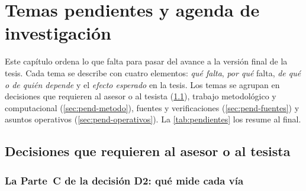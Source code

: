 \chapter{Temas pendientes y agenda de investigación}
\label{cap:pendientes}

Este capítulo ordena lo que falta para pasar del avance a la versión final de la tesis. Cada tema
se describe con cuatro elementos: \emph{qué falta}, \emph{por qué} falta, \emph{de qué o de quién
depende} y el \emph{efecto esperado} en la tesis. Los temas se agrupan en decisiones que requieren
al asesor o al tesista (\cref{sec:pend-decisiones}), trabajo metodológico y computacional
(\cref{sec:pend-metodo}), fuentes y verificaciones (\cref{sec:pend-fuentes}) y asuntos operativos
(\cref{sec:pend-operativos}). La \cref{tab:pendientes} los resume al final.

\newcommand{\tema}[4]{%
\begin{description}[style=nextline, leftmargin=1.2em, itemsep=1pt]
  \item[Qué falta] #1
  \item[Por qué] #2
  \item[Depende de] #3
  \item[Efecto esperado] #4
\end{description}}

\section{Decisiones que requieren al asesor o al tesista}
\label{sec:pend-decisiones}

\subsection{La Parte~C de la decisión D2: qué mide cada vía}
\label{sec:pend-parte-c}

